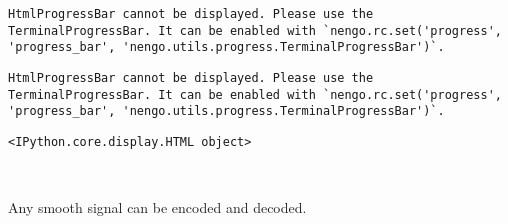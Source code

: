 \documentclass[11pt]{article}
\newcommand{\prompt}[4]{
        \llap{{\color{#2}[#3]: #4}}\vspace{-1.25em}
    }
\begin{document}
    
    \begin{verbatim}
HtmlProgressBar cannot be displayed. Please use the TerminalProgressBar. It can be enabled with `nengo.rc.set('progress', 'progress_bar', 'nengo.utils.progress.TerminalProgressBar')`.
    \end{verbatim}

    
    
    
    
    \begin{verbatim}
HtmlProgressBar cannot be displayed. Please use the TerminalProgressBar. It can be enabled with `nengo.rc.set('progress', 'progress_bar', 'nengo.utils.progress.TerminalProgressBar')`.
    \end{verbatim}

    
    
    
            \begin{tcolorbox}[breakable, boxrule=.5pt, size=fbox, pad at break*=1mm, opacityfill=0]
\prompt{Out}{outcolor}{13}{\hspace{3.5pt}}
\begin{Verbatim}[commandchars=\\\{\}]
<IPython.core.display.HTML object>
\end{Verbatim}
\end{tcolorbox}
        
    \begin{center}
    \end{center}
    { \hspace*{\fill} \\}
    
    Any smooth signal can be encoded and decoded.
\end{document}
